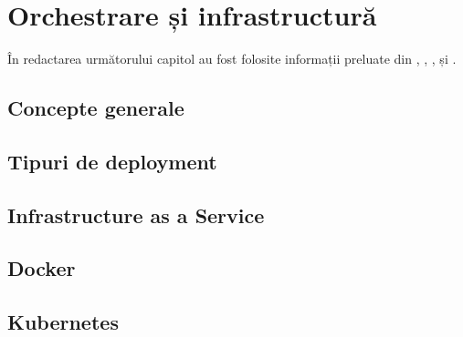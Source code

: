 \chapter{Orchestrare și infrastructură}
\label{orchestrare}
În redactarea următorului capitol au fost folosite informații preluate din
\cite{biggs_garcía_2019}, \cite{warner_2020}, \cite{turnbull_2014}, \cite{burns_hightower_beda_2019} și \cite{Burns_Villalba_Strebel_Evenson_2019}.
\section{Concepte generale}

\section{Tipuri de deployment}

\section{Infrastructure as a Service}

\section{Docker}

\section{Kubernetes}
